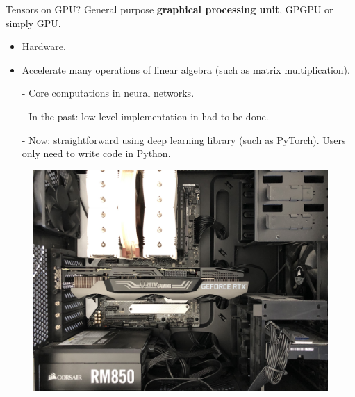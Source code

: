 \begin{frame}[fragile]{Tensors on GPU?}
 General purpose \textbf{graphical processing unit}, GPGPU or simply GPU.\\
\begin{itemize}
\item Hardware.
\item Accelerate many operations of linear algebra (such as matrix multiplication).
\item[-] Core computations in neural networks.
\item[-] In the past: low level implementation in  had to be done.
\item[-] Now: straightforward using deep learning library (such as PyTorch). Users only need to write code in Python.
\end{itemize}
\begin{minipage}{0.45\linewidth}
\begin{figure}
                        \centering
                        \includegraphics[width=.9\linewidth]{./figures/gpu_1.jpeg}
\end{figure}
\end{minipage}
\begin{minipage}{0.45\linewidth}
\begin{figure}
                        \centering

\end{figure}
\end{minipage}
\end{frame}
